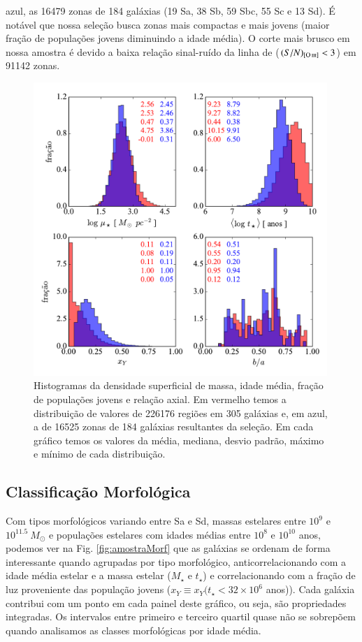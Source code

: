 azul, as 16479 zonas de 184 galáxias (19 Sa, 38 Sb, 59 Sbc, 55 Sc e 13 Sd). É notável que nossa
seleção busca zonas mais compactas e mais jovens (maior fração de populações jovens diminuindo a idade
média). O corte mais brusco em nossa amostra é devido a baixa relação sinal-ruído da linha de \oIII
($(S/N)_{\oIII} < 3$) em 91142 zonas.
\begin{figure}
	\centering
	\includegraphics[width=0.99\textwidth]{figuras/histosample.pdf}
	\caption[Histogramas: densidade superficial de massa, idade média, fração de populações jovens e
	relação axial.] 
	{Histogramas da densidade superficial de massa, idade média, fração de populações jovens e relação
axial. Em vermelho temos a distribuição de valores de 226176 regiões em 305 galáxias e, em azul,
a de 16525 zonas de 184 galáxias resultantes da seleção. Em cada gráfico temos os valores da média,
mediana, desvio padrão, máximo e mínimo de cada distribuição.}
	\label{fig:histosample}
\end{figure}

\subsection{Classificação Morfológica}
\label{sec:amostra:morf}

Com tipos morfológicos variando entre Sa e Sd, massas estelares entre $10^9$ e $10^{11.5}\ M_\odot$
e populações estelares com idades médias entre $10^8$ e $10^{10}$ anos, podemos ver na Fig.
\ref{fig:amostraMorf} que as galáxias se ordenam de forma interessante quando agrupadas por tipo
morfológico, anticorrelacionando com a idade média estelar e a massa estelar ($M_\star$ e $t_\star$)
e correlacionando com a fração de luz proveniente das população jovens ($x_Y \equiv x_Y (t_\star <
32 \times 10^6$ anos)). Cada galáxia contribui com um ponto em cada painel deste gráfico, ou seja,
são propriedades integradas. Os intervalos entre primeiro e terceiro quartil quase não se sobrepõem
quando analisamos as classes morfológicas por idade média.

